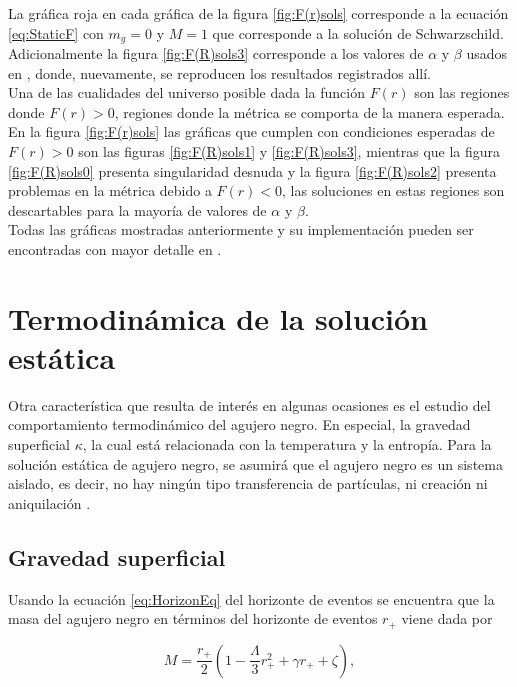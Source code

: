   La gráfica roja en cada gráfica de la figura \ref{fig:F(r)sols} corresponde a la ecuación \eqref{eq:StaticF} con $m_g=0$ y $M=1$ que corresponde a la solución de Schwarzschild. Adicionalmente la figura \ref{fig:F(R)sols3} corresponde a los valores de $\alpha$ y $\beta$ usados en \cite{AClassOfBlackHoles}, donde, nuevamente, se reproducen los resultados registrados allí.\\
  
  Una de las cualidades del universo posible dada la función $F(r)$ son las regiones donde $F(r)>0$, regiones donde la métrica se comporta de la manera esperada. En la figura \ref{fig:F(r)sols} las gráficas que cumplen con condiciones esperadas de $F(r)>0$ son las figuras \ref{fig:F(R)sols1} y \ref{fig:F(R)sols3}, mientras que la figura \ref{fig:F(R)sols0} presenta singularidad desnuda y la figura \ref{fig:F(R)sols2} presenta problemas en la métrica debido a $F(r)<0$, las soluciones en estas regiones son descartables para la mayoría de valores de $\alpha $ y $\beta$.\\
 
  
  Todas las gráficas mostradas anteriormente y su implementación pueden ser encontradas con mayor detalle en \cite{GitHub}.

\section{Termodinámica de la solución estática} 

Otra característica que resulta de interés en algunas ocasiones es el estudio del comportamiento termodinámico del agujero negro. En especial, la gravedad superficial $\kappa$, la cual está relacionada con la temperatura y la entropía. Para la solución estática de agujero negro, se asumirá que el agujero negro es un sistema aislado, es decir, no hay ningún tipo transferencia de partículas, ni creación ni aniquilación \cite{AClassOfBlackHoles}.

\subsection{Gravedad superficial}

Usando la ecuación \eqref{eq:HorizonEq} del horizonte de eventos se encuentra que la masa del agujero negro en términos del horizonte de eventos $r_+$ viene dada por

\begin{equation}
    M=\dfrac{r_+}{2}\left(1-\dfrac{\Lambda}{3}r_+^2+\gamma r_++\zeta\right),
\end{equation}


